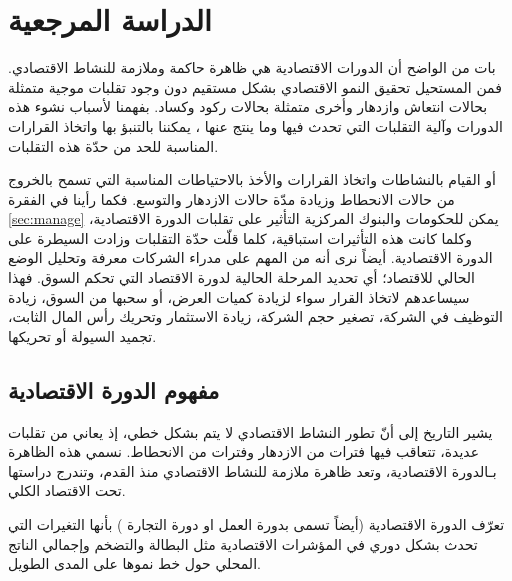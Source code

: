 
\chapter{الدراسة المرجعية}
بات من الواضح أن الدورات الاقتصادية هي ظاهرة حاكمة وملازمة للنشاط الاقتصادي. فمن المستحيل تحقيق النمو الاقتصادي بشكل مستقيم دون وجود تقلبات موجية متمثلة بحالات
انتعاش وازدهار وأخرى متمثلة بحالات ركود وكساد. بفهمنا لأسباب نشوء هذه الدورات وآلية التقلبات التي تحدث فيها
\parencite{10:mvcp}
وما ينتج عنها \cite{1:misp}، يمكننا بالتنبؤ بها واتخاذ القرارات المناسبة للحد
من حدّة هذه التقلبات.  \cite{wolfram:mvc}

أو القيام بالنشاطات واتخاذ القرارات والأخذ بالاحتياطات المناسبة التي تسمح بالخروج من حالات الانحطاط وزيادة مدّة حالات الازدهار والتوسع.
فكما رأينا في الفقرة \ref{sec:manage} يمكن للحكومات والبنوك المركزية التأثير على تقلبات الدورة الاقتصادية، وكلما كانت هذه التأثيرات استباقية، كلما قلّت حدّة التقلبات
وزادت السيطرة على الدورة الاقتصادية.
أيضاً نرى أنه من المهم على مدراء الشركات معرفة وتحليل الوضع الحالي للاقتصاد؛ أي تحديد المرحلة الحالية لدورة الاقتصاد التي تحكم السوق. فهذا سيساعدهم لاتخاذ القرار
سواء لزيادة كميات العرض، أو سحبها من السوق، زيادة التوظيف في الشركة، تصغير حجم الشركة، زيادة الاستثمار وتحريك رأس المال الثابت، تجميد السيولة أو تحريكها.

\section{مفهوم الدورة الاقتصادية}
يشير التاريخ إلى أنّ تطور النشاط الاقتصادي لا يتم بشكل خطي، إذ يعاني من تقلبات عديدة، تتعاقب فيها فترات من الازدهار وفترات من الانحطاط.
نسمي هذه الظاهرة بـالدورة الاقتصادية، وتعد ظاهرة ملازمة للنشاط الاقتصادي منذ القدم، وتندرج دراستها تحت الاقتصاد الكلي.

تعرّف الدورة الاقتصادية  
(أيضاً تسمى بدورة العمل  او دورة التجارة ) 
بأنها التغيرات التي تحدث بشكل دوري في المؤشرات الاقتصادية 
مثل البطالة والتضخم وإجمالي الناتج المحلي حول خط نموها على المدى الطويل.

